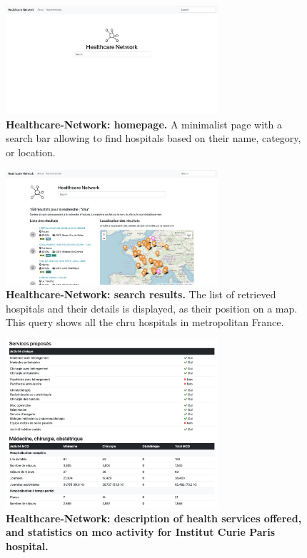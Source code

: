 
\begin{figure}[H]
    \includegraphics[width=0.7\textwidth]{images/healthcare-network/home.png}
    \centering
    \caption{
        \textbf{Healthcare-Network: homepage.} A minimalist page with a search bar allowing to find hospitals based on their name, category, or location.
    }
    \label{fig:hn-home}
\end{figure}


\begin{figure}[H]
    \includegraphics[width=0.7\textwidth]{images/healthcare-network/search.png}
    \centering
    \caption{
        \textbf{Healthcare-Network: search results.} The list of retrieved hospitals and their details is displayed, as their position on a map. This query shows all the \ac{chru} hospitals in metropolitan France.
    }
    \label{fig:hn-search}
\end{figure}


\begin{figure}[H]
    \includegraphics[width=0.7\textwidth]{images/healthcare-network/curie-services.png}
    \centering
    \caption{
        \textbf{Healthcare-Network: description of health services offered, and statistics on \ac{mco} activity for Institut Curie Paris hospital.}
    }
    \label{fig:hn-curie-services}
\end{figure}


